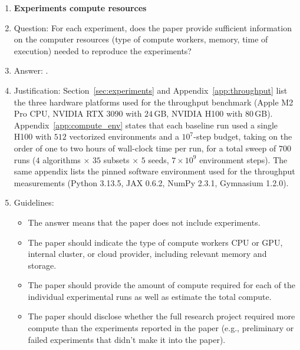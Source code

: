 \begin{enumerate}
\item {\bf Experiments compute resources}
    \item[] Question: For each experiment, does the paper provide sufficient information on the computer resources (type of compute workers, memory, time of execution) needed to reproduce the experiments?
    \item[] Answer: \answerYes{}.
    \item[] Justification: Section~\ref{sec:experiments} and Appendix~\ref{app:throughput} list the three hardware platforms used for the throughput benchmark (Apple M2 Pro CPU, NVIDIA RTX 3090 with $24$\,GB, NVIDIA H100 with $80$\,GB). Appendix~\ref{app:compute_env} states that each baseline run used a single H100 with $512$ vectorized environments and a $10^7$-step budget, taking on the order of one to two hours of wall-clock time per run, for a total sweep of $700$ runs ($4$ algorithms $\times$ $35$ subsets $\times$ $5$ seeds, $7\times 10^9$ environment steps). The same appendix lists the pinned software environment used for the throughput measurements (Python 3.13.5, JAX 0.6.2, NumPy 2.3.1, Gymnasium 1.2.0).
    \item[] Guidelines:
    \begin{itemize}
        \item The answer \answerNA{} means that the paper does not include experiments.
        \item The paper should indicate the type of compute workers CPU or GPU, internal cluster, or cloud provider, including relevant memory and storage.
        \item The paper should provide the amount of compute required for each of the individual experimental runs as well as estimate the total compute. 
        \item The paper should disclose whether the full research project required more compute than the experiments reported in the paper (e.g., preliminary or failed experiments that didn't make it into the paper). 
    \end{itemize}
    

\end{enumerate}
